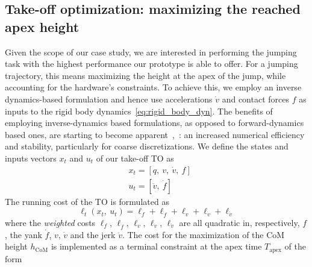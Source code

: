 \subsection{Take-off optimization: maximizing the reached apex height}\label{subsec:takeoff_opt}
Given the scope of our case study, we are interested in performing the jumping task with the highest performance our prototype is able to offer. For a jumping trajectory, this means maximizing the height at the apex of the jump, while accounting for the hardware's constraints. To achieve this, we employ an inverse dynamics-based formulation and hence use accelerations $\dot{v}$ and contact forces $f$ as inputs to the rigid body dynamics~\eqref{eq:rigid_body_dyn}. The benefits of employing inverse-dynamics based formulations, as opposed to forward-dynamics based ones, are starting to become apparent~\cite{to::ferrolho2021inverse},~\cite{to::mastalli2022inverse}: an increased numerical efficiency and stability, particularly for coarse discretizations. We define the states and inputs vectors $x_t$ and $u_t$ of  our take-off TO as
\begin{eqnarray}
&x_t = \left[q,~v,~\dot{v},~f\right]\label{eq:states_takeoff_opt}\\
&u_t = \left[\ddot{v},~\dot{f}\right]\label{eq:inputs_takeoff_opt}
\end{eqnarray}
The running cost of the TO is formulated as
\begin{dmath}\label{eq:takeoff_running_cost}
    \ell_{t}(x_t,~u_t) = \ell_f + \ell_{\dot{f}} + \ell_{v} +  \ell_{\dot{v}} + \ell_{\ddot{v}}
\end{dmath}
where the \textit{weighted} costs $\ell_{f}$, $\ell_{\dot{f}}$, $\ell_{v}$, $\ell_{\dot{v}}$, $\ell_{\ddot{v}}$ are all quadratic in, respectively, $f$, the yank $\dot{f}$, $v$, $\dot{v}$ and the jerk $\ddot{v}$. 
The cost for the maximization of the CoM height $h_{\mathrm{CoM}}$ is implemented as a terminal constraint at the apex time $T_{\mathrm{apex}}$ of the form 
